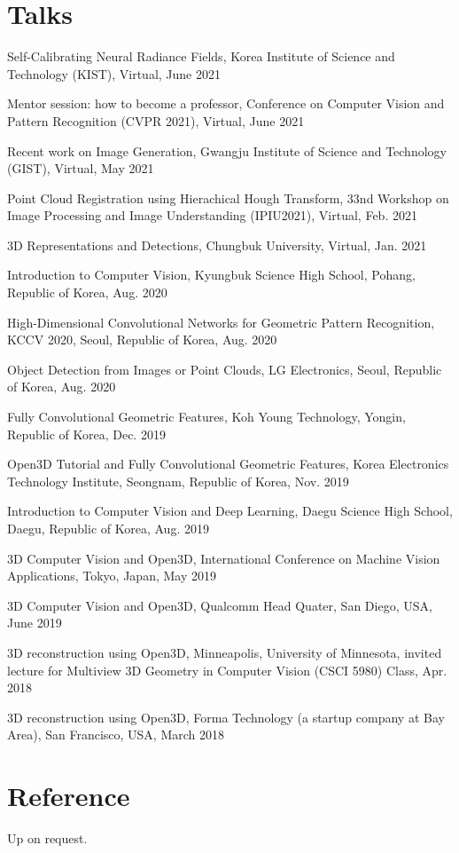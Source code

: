 \documentclass[letterpaper,11pt]{article}
\newcommand{\resumeItem}[1]{
  \small{
  \item{#1 \vspace{-2pt}}
  }
}
\newcommand{\resumeItemListStart}{\begin{itemize}}
\newcommand{\resumeItemListEnd}{\end{itemize}\vspace{-5pt}}
\begin{document}
\section{Talks}
\resumeItemListStart
    \resumeItem{Self-Calibrating Neural Radiance Fields, Korea Institute of Science and Technology (KIST), Virtual, June 2021}
    \resumeItem{Mentor session: how to become a professor, Conference on Computer Vision and Pattern Recognition (CVPR 2021), Virtual, June 2021}
    \resumeItem{Recent work on Image Generation, Gwangju Institute of Science and Technology (GIST), Virtual, May 2021}
    \resumeItem{Point Cloud Registration using Hierachical Hough Transform, 33nd Workshop on Image Processing and Image Understanding (IPIU2021), Virtual, Feb. 2021}
    \resumeItem{3D Representations and Detections, Chungbuk University, Virtual, Jan. 2021}
    \resumeItem{Introduction to Computer Vision, Kyungbuk Science High School, Pohang, Republic of Korea, Aug. 2020}
    \resumeItem{High-Dimensional Convolutional Networks for Geometric Pattern Recognition, KCCV 2020, Seoul, Republic of Korea, Aug. 2020}
    \resumeItem{Object Detection from Images or Point Clouds, LG Electronics, Seoul, Republic of Korea, Aug. 2020}
    \resumeItem{Fully Convolutional Geometric Features, Koh Young Technology, Yongin, Republic of Korea, Dec. 2019}
    \resumeItem{Open3D Tutorial and Fully Convolutional Geometric Features, Korea Electronics Technology Institute, Seongnam, Republic of Korea, Nov. 2019}
    \resumeItem{Introduction to Computer Vision and Deep Learning, Daegu Science High School, Daegu, Republic of Korea, Aug. 2019}
    \resumeItem{3D Computer Vision and Open3D, International Conference on Machine Vision Applications, Tokyo, Japan, May 2019}
    \resumeItem{3D Computer Vision and Open3D, Qualcomm Head Quater, San Diego, USA, June 2019}
    \resumeItem{3D reconstruction using Open3D, Minneapolis, University of Minnesota, invited lecture for Multiview 3D Geometry in Computer Vision (CSCI 5980) Class, Apr. 2018}
    \resumeItem{3D reconstruction using Open3D, Forma Technology (a startup company at Bay Area), San Francisco, USA, March 2018}
\resumeItemListEnd





\section{Reference}
\resumeItemListStart
\resumeItem{Up on request.}
\resumeItemListEnd
\end{document}
